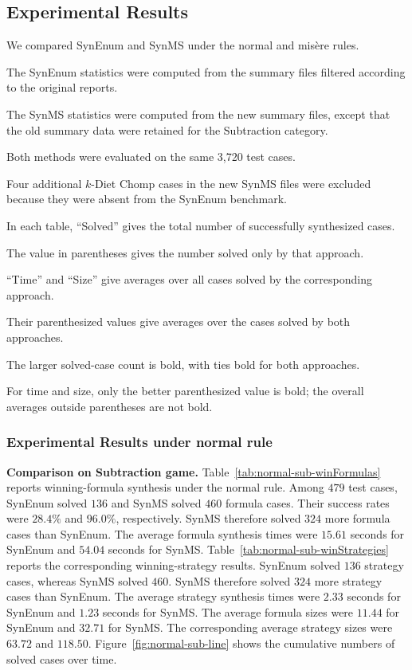 \documentclass[review]{elsarticle}
\begin{document}
\subsection{Experimental Results}


{\color{red}
We compared SynEnum and SynMS under the normal and mis\`{e}re rules.

The SynEnum statistics were computed from the summary files filtered according to the original reports.

The SynMS statistics were computed from the new summary files, except that the old summary data were retained for the Subtraction category.

Both methods were evaluated on the same 3,720 test cases.

Four additional $k$-Diet Chomp cases in the new SynMS files were excluded because they were absent from the SynEnum benchmark.

In each table, ``Solved'' gives the total number of successfully synthesized cases.

The value in parentheses gives the number solved only by that approach.

``Time'' and ``Size'' give averages over all cases solved by the corresponding approach.

Their parenthesized values give averages over the cases solved by both approaches.

The larger solved-case count is bold, with ties bold for both approaches.

For time and size, only the better parenthesized value is bold; the overall averages outside parentheses are not bold.
}

\subsubsection{Experimental Results under normal rule}

{\color{red}
\textbf{Comparison on Subtraction game.}
Table~\ref{tab:normal-sub-winFormulas} reports winning-formula synthesis under the normal rule.
Among $479$ test cases, SynEnum solved $136$ and SynMS solved $460$ formula cases.
Their success rates were $28.4\%$ and $96.0\%$, respectively.
SynMS therefore solved $324$ more formula cases than SynEnum.
The average formula synthesis times were $15.61$ seconds for SynEnum and $54.04$ seconds for SynMS.
Table~\ref{tab:normal-sub-winStrategies} reports the corresponding winning-strategy results.
SynEnum solved $136$ strategy cases, whereas SynMS solved $460$.
SynMS therefore solved $324$ more strategy cases than SynEnum.
The average strategy synthesis times were $2.33$ seconds for SynEnum and $1.23$ seconds for SynMS.
The average formula sizes were $11.44$ for SynEnum and $32.71$ for SynMS.
The corresponding average strategy sizes were $63.72$ and $118.50$.
Figure~\ref{fig:normal-sub-line} shows the cumulative numbers of solved cases over time.
}
\end{document}
